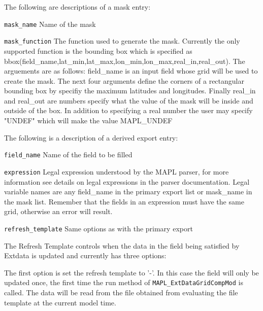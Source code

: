 The following are descriptions of a mask entry:
\begin{trivlist}
\item[\tt mask\_name]         Name of the mask
\item[\tt mask\_function]     The function used to generate the mask. 
                              Currently the only supported function is the bounding box which is specified as
                              bbox(field\_name,lat\_min,lat\_max,lon\_min,lon\_max,real\_in,real\_out).
                              The arguements are as follows: field\_name is an input field whose grid
                              will be used to create the mask. The next four arguments define the corners
                              of a rectangular bounding box by specifiy the maximum latitudes and longitudes.
                              Finally real\_in and real\_out are numbers specify what the value of the mask
                              will be inside and outside of the box. In addition to specifying a real number
                              the user may specify "UNDEF" which will make the value MAPL\_UNDEF
\end{trivlist}

The following is a description of a derived export entry:
\begin{trivlist}
\item[\tt field\_name]        Name of the field to be filled
\item[\tt expression]         Legal expression understood by the MAPL parser, for more information see details
                              on legal expressions in the parser documentation. Legal variable names
                              are any field\_name in the primary export list or mask\_name in
                              the mask list. Remember that the fields in an expression
                              must have the same grid, otherwise an error will result.
\item[\tt refresh\_template]  Same options as with the primary export
\end{trivlist}

The Refresh Template controls when the data in the field being satisfied by Extdata is updated and currently has three options:

The first option is set the refresh template to '-'. In this case the field will only be updated once, the first time
the run method of {\tt MAPL\_ExtDataGridCompMod} is called. The data will be read from the file
obtained from evaluating the file template at the current model time.

